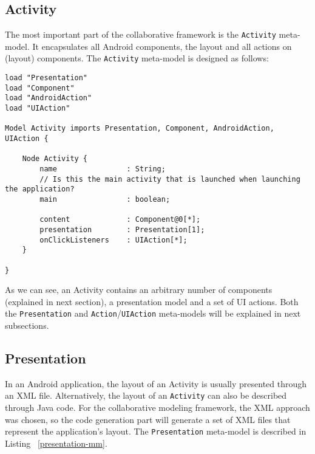 \subsection{Activity}

The most important part of the collaborative framework is the \texttt{Activity} meta-model. It encapsulates all Android components, the layout and all actions on (layout) components. The \texttt{Activity} meta-model is designed as follows:

\begin{lstlisting}[label=activity-mm,caption=Activity meta-model, captionpos=t]
load "Presentation"
load "Component"
load "AndroidAction"
load "UIAction"

Model Activity imports Presentation, Component, AndroidAction, UIAction {

	Node Activity {
		name				: String;
		// Is this the main activity that is launched when launching the application?
		main 				: boolean;

		content				: Component@0[*];
		presentation		: Presentation[1];
		onClickListeners 	: UIAction[*];
	}

}
\end{lstlisting}
As we can see, an Activity contains an arbitrary number of components (explained in next section), a presentation model and a set of UI actions. Both the \texttt{Presentation} and \texttt{Action}/\texttt{UIAction} meta-models will be explained in next subsections.

\subsection{Presentation}

In an Android application, the layout of an Activity is usually presented through an XML file. Alternatively, the layout of an \texttt{Activity} can also be described through Java code. For the collaborative modeling framework, the XML approach was chosen, so the code generation part will generate a set of XML files that represent the application's layout. The \texttt{Presentation} meta-model is described in Listing ~\ref{presentation-mm}.


